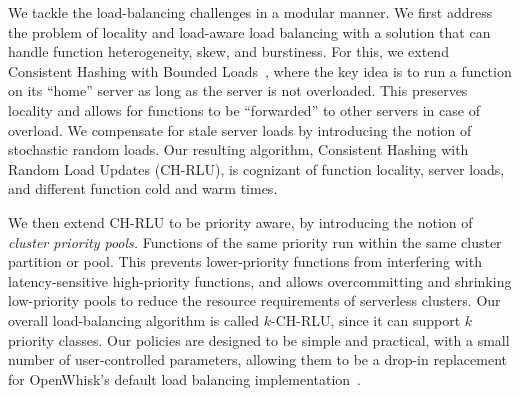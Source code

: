We tackle the load-balancing challenges in a modular manner. 
We first address the problem of locality and load-aware load balancing with a solution that can handle function heterogeneity, skew, and burstiness.
For this, we extend Consistent Hashing with Bounded Loads~\cite{mirrokni2018consistent}, where the key idea is to run a function on its ``home'' server as long as the server is not overloaded.
This preserves locality and allows for functions to be ``forwarded'' to other servers in case of overload. 
We compensate for stale server loads by introducing the notion of stochastic random loads. 
Our resulting algorithm, Consistent Hashing with Random Load Updates (CH-RLU), is cognizant of function locality, server loads, and different function cold and warm times.


We then extend CH-RLU to be priority aware, by introducing the notion of \emph{cluster priority pools.} 
Functions of the same priority run within the same cluster partition or pool.
This prevents lower-priority functions from interfering with latency-sensitive high-priority functions, and allows overcommitting and shrinking low-priority pools to reduce the resource requirements of serverless clusters. 
Our overall load-balancing algorithm is called $k$-CH-RLU, since it can support $k$ priority classes. 
Our policies are designed to be simple and practical, with a small number of user-controlled parameters, allowing them to be a drop-in replacement for OpenWhisk's default load balancing implementation~\cite{openwhisk}. 


